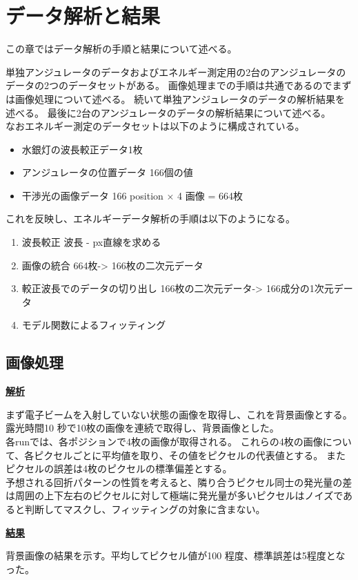\documentclass[a4paper,11pt,uplatex]{jsbook}
\begin{document}
\chapter{データ解析と結果}
この章ではデータ解析の手順と結果について述べる。

単独アンジュレータのデータおよびエネルギー測定用の2台のアンジュレータのデータの2つのデータセットがある。
画像処理までの手順は共通であるのでまずは画像処理について述べる。
続いて単独アンジュレータのデータの解析結果を述べる。
最後に2台のアンジュレータのデータの解析結果について述べる。\\
なおエネルギー測定のデータセットは以下のように構成されている。
\begin{itemize}
  \item 水銀灯の波長較正データ1枚
  \item アンジュレータの位置データ 166個の値
  \item 干渉光の画像データ 166 position $\times$ 4 画像 = 664枚
\end{itemize}
これを反映し、エネルギーデータ解析の手順は以下のようになる。
\begin{enumerate}
  \item 波長較正 波長 - px直線を求める
  \item 画像の統合 664枚-> 166枚の二次元データ
  \item 較正波長でのデータの切り出し 166枚の二次元データ-> 166成分の1次元データ
  \item モデル関数によるフィッティング
\end{enumerate}

\section{画像処理}
\noindent \textbf{\underline{解析}}\par
まず電子ビームを入射していない状態の画像を取得し、これを背景画像とする。露光時間10 秒で10枚の画像を連続で取得し、背景画像とした。\\
各runでは、各ポジションで4枚の画像が取得される。
これらの4枚の画像について、各ピクセルごとに平均値を取り、その値をピクセルの代表値とする。
またピクセルの誤差は4枚のピクセルの標準偏差とする。\\
予想される回折パターンの性質を考えると、隣り合うピクセル同士の発光量の差は周囲の上下左右のピクセルに対して極端に発光量が多いピクセルはノイズであると判断してマスクし、フィッティングの対象に含まない。

\noindent \textbf{\underline{結果}}\par
背景画像の結果を示す。平均してピクセル値が100 程度、標準誤差は5程度となった。
\end{document}
